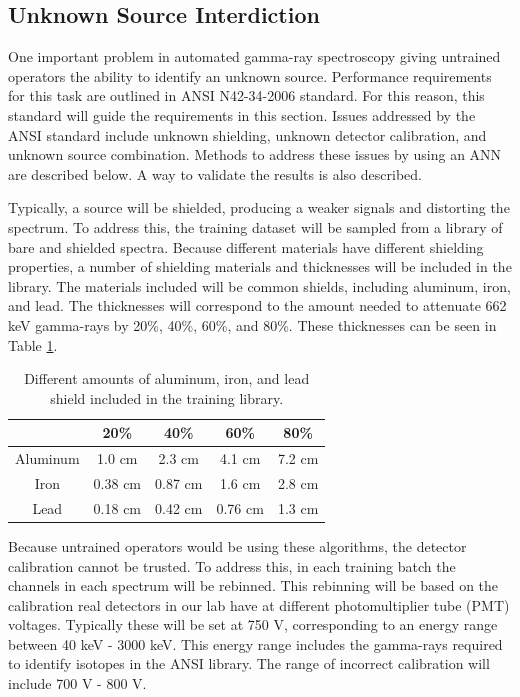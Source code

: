 \documentclass[tocnosub,noragright,centerchapter,12pt,fullpage]{uiucecethesis09}
\begin{document}
\subsection{Unknown Source Interdiction} \label{UnknownSourceInterdiction}

One important problem in automated gamma-ray spectroscopy giving untrained operators the ability to identify an unknown source. Performance requirements for this task are outlined in ANSI N42-34-2006 standard. For this reason, this standard will guide the requirements in this section. Issues addressed by the ANSI standard include unknown shielding, unknown detector calibration, and unknown source combination. Methods to address these issues by using an ANN are described below. A way to validate the results is also described. 

Typically, a source will be shielded, producing a weaker signals and distorting the spectrum. To address this, the training dataset will be sampled from a library of bare and shielded spectra. Because different materials have different shielding properties, a number of shielding materials and thicknesses will be included in the library. The materials included will be common shields, including aluminum, iron, and lead. The thicknesses will correspond to the amount needed to attenuate 662 keV gamma-rays by 20\%, 40\%, 60\%, and 80\%. These thicknesses can be seen in Table \ref{table:Shielding_to_include}.

\begin{table}[H]
\centering
\caption{Different amounts of aluminum, iron, and lead shield included in the training library.}
\label{table:Shielding_to_include}
\begin{tabular}{c|c|c|c|c|}
\cline{2-5}
                               & 20\% & 40\% & 60\% & 80\% \\ \hline
\multicolumn{1}{|c|}{Aluminum} & 1.0 cm  & 2.3 cm  & 4.1 cm & 7.2 cm \\ \hline
\multicolumn{1}{|c|}{Iron}     & 0.38 cm  & 0.87 cm  & 1.6 cm & 2.8 cm  \\ \hline
\multicolumn{1}{|c|}{Lead}     & 0.18 cm  & 0.42 cm  & 0.76 cm  & 1.3 cm \\ \hline
\end{tabular}
\end{table}


Because untrained operators would be using these algorithms, the detector calibration cannot be trusted. To address this, in each training batch the channels in each spectrum will be rebinned. This rebinning will be based on the calibration real detectors in our lab have at different photomultiplier tube (PMT) voltages. Typically these will be set at 750 V, corresponding to an energy range between 40 keV - 3000 keV. This energy range includes the gamma-rays required to identify isotopes in the ANSI library. The range of incorrect calibration will include 700 V - 800 V.
\end{document}
